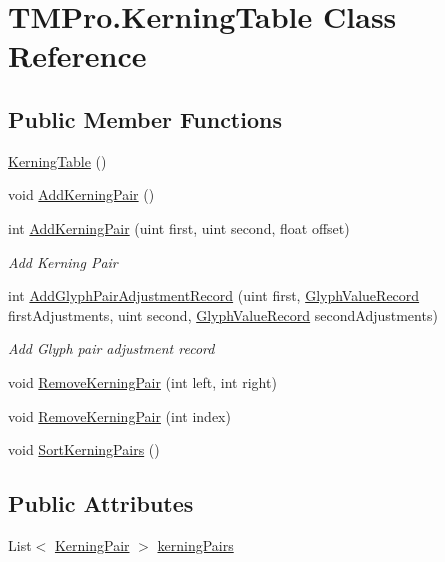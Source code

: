 \hypertarget{class_t_m_pro_1_1_kerning_table}{}\section{T\+M\+Pro.\+Kerning\+Table Class Reference}
\label{class_t_m_pro_1_1_kerning_table}
\subsection*{Public Member Functions}
\begin{DoxyCompactItemize}
\item 
\mbox{\hyperlink{class_t_m_pro_1_1_kerning_table_acb28a4ae6fdf222649652f91218cae9c}{Kerning\+Table}} ()
\item 
void \mbox{\hyperlink{class_t_m_pro_1_1_kerning_table_a3cfe2b9dd2b7135e385b740f4c708e99}{Add\+Kerning\+Pair}} ()
\item 
int \mbox{\hyperlink{class_t_m_pro_1_1_kerning_table_ab052c4492d7d9ecf26f48d96d55068e2}{Add\+Kerning\+Pair}} (uint first, uint second, float offset)
\begin{DoxyCompactList}\small\item\em Add Kerning Pair \end{DoxyCompactList}\item 
int \mbox{\hyperlink{class_t_m_pro_1_1_kerning_table_aeb4f4cb379a55e749915ac0a2be4de7b}{Add\+Glyph\+Pair\+Adjustment\+Record}} (uint first, \mbox{\hyperlink{struct_t_m_pro_1_1_glyph_value_record}{Glyph\+Value\+Record}} first\+Adjustments, uint second, \mbox{\hyperlink{struct_t_m_pro_1_1_glyph_value_record}{Glyph\+Value\+Record}} second\+Adjustments)
\begin{DoxyCompactList}\small\item\em Add Glyph pair adjustment record \end{DoxyCompactList}\item 
void \mbox{\hyperlink{class_t_m_pro_1_1_kerning_table_ae91f18b46670bd6276f6173017fd4ad1}{Remove\+Kerning\+Pair}} (int left, int right)
\item 
void \mbox{\hyperlink{class_t_m_pro_1_1_kerning_table_ab76c9c7d1432c3be2b33abf59c34b078}{Remove\+Kerning\+Pair}} (int index)
\item 
void \mbox{\hyperlink{class_t_m_pro_1_1_kerning_table_a0d83761d66f1df6a94704d50363347d5}{Sort\+Kerning\+Pairs}} ()
\end{DoxyCompactItemize}
\subsection*{Public Attributes}
\begin{DoxyCompactItemize}
\item 
List$<$ \mbox{\hyperlink{class_t_m_pro_1_1_kerning_pair}{Kerning\+Pair}} $>$ \mbox{\hyperlink{class_t_m_pro_1_1_kerning_table_a6f730e99745068724bd59af38b2a999c}{kerning\+Pairs}}
\end{DoxyCompactItemize}


